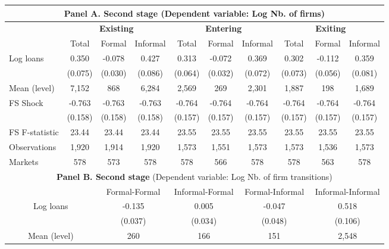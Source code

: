 \centering
\begin{threeparttable}
\begin{tabular}{lccccccccc}
\toprule
\multicolumn{10}{c}{\textbf{Panel A. Second stage} (Dependent variable: Log Nb. of firms)} \\
\midrule
 & \multicolumn{3}{c}{\textbf{Existing}} & \multicolumn{3}{c}{\textbf{Entering}} & \multicolumn{3}{c}{\textbf{Exiting}} \\
\cmidrule(lr){2-10}
& Total 
& Formal 
& \multicolumn{1}{c}{Informal}
& Total 
& Formal 
& \multicolumn{1}{c}{Informal}
& Total 
& Formal 
& Informal \\
\midrule
Log loans 
&  0.350  & -0.078  & 0.427   &  0.313  & -0.072   & 0.369  & 0.302   & -0.112   & 0.359 \\
& (0.075) & (0.030) & (0.086) & (0.064) & (0.032) & (0.072) & (0.073) & (0.056) & (0.081) \\
\midrule
Mean (level) & 7,152 & 868 & 6,284 & 2,569 & 269 & 2,301 & 1,887 & 198 & 1,689\\
\midrule
FS Shock & -0.763 & -0.763 & -0.763 & -0.764 & -0.764 & -0.764 & -0.764 & -0.764 & -0.764 \\
& (0.158) & (0.158) & (0.158) & (0.157) & (0.157) & (0.157) & (0.157) & (0.157) & (0.157) \\
FS F-statistic & 23.44 & 23.44 & 23.44 & 23.55 & 23.55 & 23.55 & 23.55 & 23.55 & 23.55 \\
Observations & 1,920 & 1,914 & 1,920 & 1,573 & 1,551 & 1,573 & 1,573 & 1,536 & 1,573 \\
Markets & 578 & 573 & 578 & 578 & 566 & 578 & 578 & 563 & 578 \\
\midrule
\multicolumn{10}{c}{\textbf{Panel B. Second stage} (Dependent variable: Log Nb. of firm transitions)} \\

\midrule
\multicolumn{2}{c}{} & \multicolumn{2}{c}{Formal-Formal} & \multicolumn{2}{c}{Informal-Formal} & \multicolumn{2}{c}{Formal-Informal} & \multicolumn{2}{c}{Informal-Informal} \\
\cmidrule(lr){3-10}
\multicolumn{2}{c}{Log loans} & \multicolumn{2}{c}{-0.135} & \multicolumn{2}{c}{0.005} & \multicolumn{2}{c}{-0.047} & \multicolumn{2}{c}{0.518} \\
\multicolumn{2}{c}{} & \multicolumn{2}{c}{(0.037)} & \multicolumn{2}{c}{(0.034)} & \multicolumn{2}{c}{(0.048)} & \multicolumn{2}{c}{(0.106)} \\
\midrule
\multicolumn{2}{c}{Mean (level)} & \multicolumn{2}{c}{260} & \multicolumn{2}{c}{166} & \multicolumn{2}{c}{151} & \multicolumn{2}{c}{2,548} \\
\midrule


\end{tabular}
\end{threeparttable}

